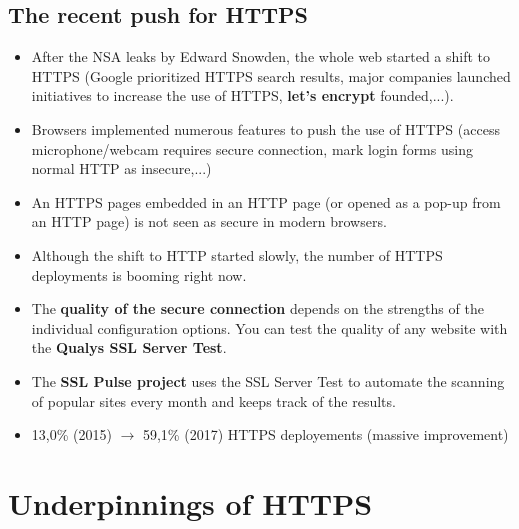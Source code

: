 \documentclass[../main.tex]{subfiles}
\begin{document}
\subsection{The recent push for HTTPS}
\begin{itemize}
\item After the NSA leaks by Edward Snowden, the whole web started a shift to HTTPS (Google prioritized HTTPS search results, major companies launched initiatives to increase the use of HTTPS, \textbf{let's encrypt} founded,...).
\item Browsers implemented numerous features to push the use of HTTPS (access microphone/webcam requires secure connection, mark login forms using normal HTTP as insecure,...)
\item An HTTPS pages embedded in an HTTP page (or opened as a pop-up from an HTTP page) is not seen as secure in modern browsers.
\item Although the shift to HTTP started slowly, the number of HTTPS deployments is booming right now.
\item The \textbf{quality of the secure connection} depends on the strengths of the individual configuration options. You can test the quality of any website with the \textbf{Qualys SSL Server Test}.
\item The \textbf{SSL Pulse project} uses the SSL Server Test to automate the scanning of popular sites every month and keeps track of the results.
\item 13,0\% (2015) $\rightarrow$ 59,1\% (2017) HTTPS deployements (massive improvement)
\end{itemize}

\section{Underpinnings of HTTPS}
\end{document}
